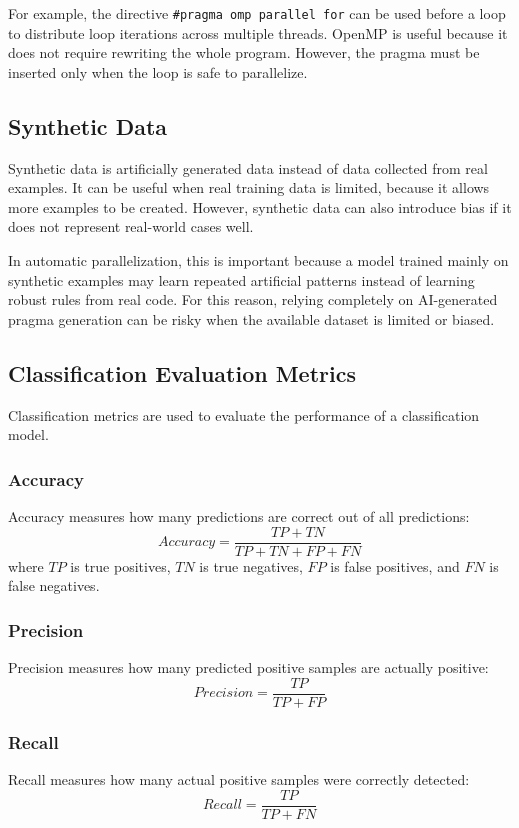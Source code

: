 \documentclass[12pt,a4paper]{report}
\begin{document}
For example, the directive \texttt{\#pragma omp parallel for} can be used before
a loop to distribute loop iterations across multiple threads. OpenMP is useful
because it does not require rewriting the whole program. However, the pragma must
be inserted only when the loop is safe to parallelize.

\subsection{Synthetic Data}
Synthetic data is artificially generated data instead of data collected from real
examples. It can be useful when real training data is limited, because it allows
more examples to be created. However, synthetic data can also introduce bias if
it does not represent real-world cases well.

In automatic parallelization, this is important because a model trained mainly on
synthetic examples may learn repeated artificial patterns instead of learning
robust rules from real code. For this reason, relying completely on AI-generated
pragma generation can be risky when the available dataset is limited or biased.

\newpage
\subsection{Classification Evaluation Metrics}
Classification metrics are used to evaluate the performance of a classification
model.

\subsubsection{Accuracy}
Accuracy measures how many predictions are correct out of all predictions:
\[
Accuracy = \frac{TP + TN}{TP + TN + FP + FN}
\]
where $TP$ is true positives, $TN$ is true negatives, $FP$ is false positives,
and $FN$ is false negatives.

\subsubsection{Precision}
Precision measures how many predicted positive samples are actually positive:
\[
Precision = \frac{TP}{TP + FP}
\]

\subsubsection{Recall}
Recall measures how many actual positive samples were correctly detected:
\[
Recall = \frac{TP}{TP + FN}
\]
\end{document}
